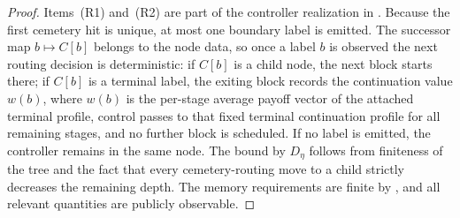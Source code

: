 \documentclass[12pt]{article}
\theoremstyle{definition}
\newcommand{\1}{\mathbf{1}}
\begin{document}
\begin{proof}
Items~(R1) and~(R2) are part of the controller realization in
. Because the first cemetery hit is unique, at most one
boundary label is emitted. The successor map $b\mapsto C[b]$ belongs to the node
data, so once a label $b$ is observed the next routing decision is deterministic:
if $C[b]$ is a child node, the next block starts there; if $C[b]$ is a terminal
label, the exiting block records the continuation value $w(b)$, where $w(b)$ is
the per-stage average payoff vector of the attached terminal profile, control
passes to that fixed terminal continuation profile for all remaining stages, and
no further block is scheduled. If no label is emitted, the controller remains
in the same node. The bound by $D_\eta$ follows from finiteness of the tree and
the fact that every cemetery-routing move to a child strictly decreases the
remaining depth. The memory requirements are finite by
, and all relevant quantities are publicly observable.
\end{proof}
\end{document}

